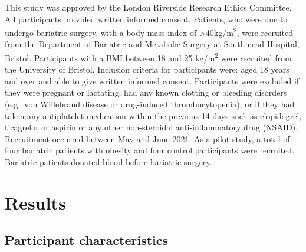 \documentclass[11pt,twoside]{bristolthesis}
\begin{document}
This study was approved by the London Riverside Research Ethics Committee. All participants provided written informed consent. Patients, who were due to undergo bariatric surgery, with a body mass index of \textgreater40kg/m\textsuperscript{2}, were recruited from the Department of Bariatric and Metabolic Surgery at Southmead Hospital, Bristol. Participants with a BMI between 18 and 25 kg/m\textsuperscript{2} were recruited from the University of Bristol. Inclusion criteria for participants were: aged 18 years and over and able to give written informed consent. Participants were excluded if they were pregnant or lactating, had any known clotting or bleeding disorders (e.g.~von Willebrand disease or drug-induced thrombocytopenia), or if they had taken any antiplatelet medication within the previous 14 days such as clopidogrel, ticagrelor or aspirin or any other non-steroidal anti-inflammatory drug (NSAID). Recruitment occurred between May and June 2021. As a pilot study, a total of four bariatric patients with obesity and four control participants were recruited. Bariatric patients donated blood before bariatric surgery.

\hypertarget{results-1}{%
\section{Results}\label{results-1}}

\hypertarget{participant-characteristics}{%
\subsection{Participant characteristics}\label{participant-characteristics}}
\end{document}
